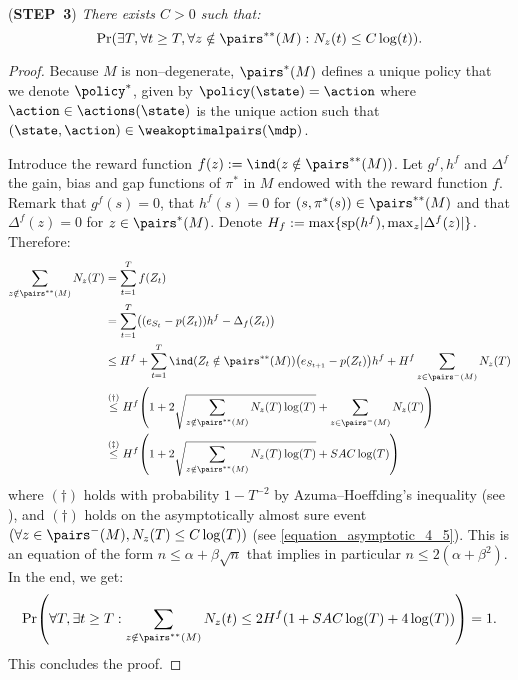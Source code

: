 \documentclass[preprint,cleveref,12pt]{colt2025}
\DeclarePairedDelimiter{\braces}{\{}{\}}	%
\DeclarePairedDelimiter{\parens}{(}{)}	%
\DeclarePairedDelimiter{\abs}{\lvert}{\rvert}	%
\newcommand{\indic}[1]{\ind\parens{#1}}
\def\indicator{\indic}
\newcommand{\vecspan}[1]{\mathrm{sp}\parens{#1}}
\def\model{\mdp}
\def\STEP#1{(\strong{STEP~#1})}
\newcommand{\strong}[1]{\textbf{#1}}
\begin{document}
    \noindent
    \STEP{3}
    \textit{
        There exists $C > 0$ such that:
        \begin{equation}
        \label{equation_asymptotic_5}
            \Pr \parens*{
                \exists T, \forall t \ge T,
                \forall z \notin \pairs^{**}(M):
                N_z(t) \le C \log(t)
            }
            .
        \end{equation}
    }
    \begin{proof}
        Because $M$ is non--degenerate, $\pairs^*(M)$ defines a unique policy that we denote $\policy^*$, given by $\policy(\state) = \action$ where $\action \in \actions(\state)$ is the unique action such that $(\state, \action) \in \weakoptimalpairs(\model)$. 

        Introduce the reward function $f(z) := \indicator{z \notin \pairs^{**}(M)}$. 
        Let $g^f, h^f$ and $\Delta^f$ the gain, bias and gap functions of $\pi^*$ in $M$ endowed with the reward function $f$.
        Remark that $g^f(s) = 0$, that $h^f(s) = 0$ for $(s, \pi^*(s)) \in \pairs^{**}(M)$ and that $\Delta^f(z) = 0$ for $z \in \pairs^*(M)$.
        Denote $H_f := \max\braces{\vecspan{h^f}, \max_z \abs{\Delta^f(z)}}$.
        Therefore:
        \begin{align*}
            \sum_{z \notin \pairs^{**}(M)} N_z(T)
            & = \sum_{t=1}^T f(Z_t)
            \\
            & = \sum_{t=1}^T \parens*{
                \parens*{e_{S_t} - p(Z_t)} h^f - \Delta_f(Z_t)
            }
            \\
            & \le 
            H^f 
            + \sum_{t=1}^T \indicator{Z_t \notin \pairs^{**}(M)} \parens*{e_{S_{t+1}} - p(Z_t)} h^f 
            + H^f \sum_{z \in \pairs^-(M)} N_z(T)
            \\
            & \overset{(\dagger)}\le
            H^f \parens*{
                1 
                + 2 \sqrt{\sum_{z \notin \pairs^{**}(M)} N_z(T) \log(T)}
                + \sum_{z \in \pairs^-(M)} N_z(T)
            }
            \\
            & \overset{(\ddagger)} \le
            H^f \parens*{
                1 
                + 2 \sqrt{\sum_{z \notin \pairs^{**}(M)} N_z(T) \log(T)}
                + S A C \log(T)
            }
        \end{align*}
        where $(\dagger)$ holds with probability $1 - T^{-2}$ by Azuma--Hoeffding's inequality (see \cite[Lemma~5]{bourel_tightening_2020}), and $(\dagger)$ holds on the asymptotically almost sure event $(\forall z \in \pairs^-(M), N_z(T) \le C \log(T))$ (see \eqref{equation_asymptotic_4_5}).
        This is an equation of the form $n \le \alpha + \beta \sqrt{n}$ that implies in particular $n \le 2(\alpha + \beta^2)$.
        In the end, we get:
        \begin{equation*}
            \Pr \parens*{
                \forall T,
                \exists t \ge T:
                \sum_{z \notin \pairs^{**}(M)} N_z(t)
                \le 
                2H^f(1 + S A C \log(T) + 4 \log(T))
            }
            = 1.
        \end{equation*}
        This concludes the proof.
    \end{proof}
\end{document}
